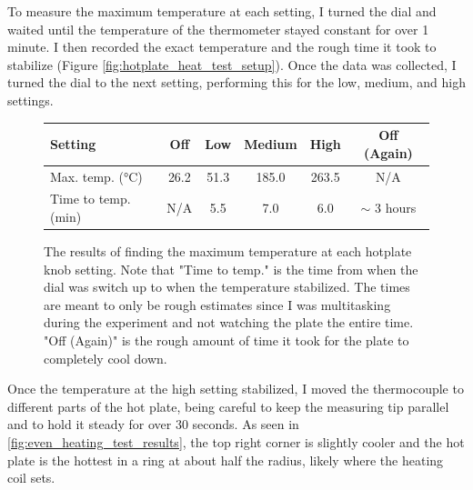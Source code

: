 \documentclass[colorlinks=true,pdfstartview=FitV,linkcolor=blue,
            citecolor=red,urlcolor=magenta]{ligodoc}
\begin{document}
To measure the maximum temperature at each setting, I turned the dial and waited until the temperature of the thermometer stayed constant for over 1 minute. I then recorded the exact temperature and the rough time it took to stabilize (Figure \ref{fig:hotplate_heat_test_setup}). Once the data was collected, I turned the dial to the next setting, performing this for the low, medium, and high settings.

\begin{figure}[htbp]
\begin{center}
  \begin{tabular}{ | l | c | c | c | c | c | }
    \hline
    Setting & Off & Low & Medium & High & Off (Again) \\ \hline
    Max. temp. (°C) & 26.2 & 51.3 & 185.0 & 263.5 &N/A \\ \hline
    Time to temp. (min)  & N/A & 5.5 & 7.0 & 6.0 & $\sim$ 3 hours \\
    \hline
  \end{tabular}
\end{center}
\caption{The results of finding the maximum temperature at each hotplate knob setting. Note that "Time to temp." is the time from when the dial was switch up to when the temperature stabilized. The times are meant to only be rough estimates since I was multitasking during the experiment and not watching the plate the entire time. "Off (Again)" is the rough amount of time it took for the plate to completely cool down.}
\label{fig:hotplate_max_heat_data}
\end{figure}

Once the temperature at the high setting stabilized, I moved the thermocouple to different parts of the hot plate, being careful to keep the measuring tip parallel and to hold it steady for over 30 seconds. As seen in \ref{fig:even_heating_test_results}, the top right corner is slightly cooler and the hot plate is the hottest in a ring at about half the radius, likely where the heating coil sets.
\end{document}
